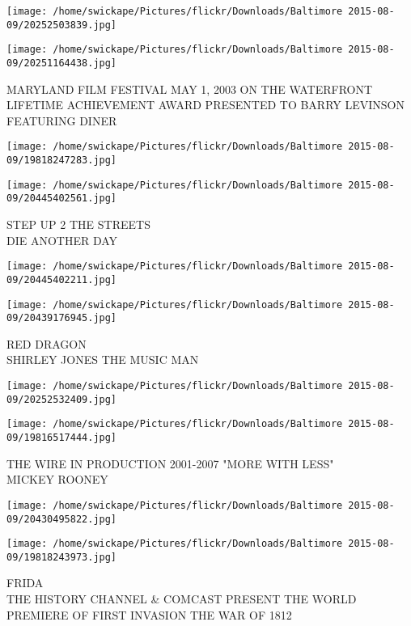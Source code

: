 \documentclass[10pt,letterpaper]{article}
\begin{document}
\texttt{[image: /home/swickape/Pictures/flickr/Downloads/Baltimore 2015-08-09/20252503839.jpg]}

\vspace{0.25in}
\texttt{[image: /home/swickape/Pictures/flickr/Downloads/Baltimore 2015-08-09/20251164438.jpg]}

MARYLAND FILM FESTIVAL MAY 1, 2003 ON THE WATERFRONT\\
LIFETIME ACHIEVEMENT AWARD PRESENTED TO BARRY LEVINSON FEATURING DINER
\pagebreak

\texttt{[image: /home/swickape/Pictures/flickr/Downloads/Baltimore 2015-08-09/19818247283.jpg]}

\vspace{0.25in}
\texttt{[image: /home/swickape/Pictures/flickr/Downloads/Baltimore 2015-08-09/20445402561.jpg]}

STEP UP 2 THE STREETS\\
DIE ANOTHER DAY
\pagebreak

\texttt{[image: /home/swickape/Pictures/flickr/Downloads/Baltimore 2015-08-09/20445402211.jpg]}

\vspace{0.25in}
\texttt{[image: /home/swickape/Pictures/flickr/Downloads/Baltimore 2015-08-09/20439176945.jpg]}

RED DRAGON\\
SHIRLEY JONES THE MUSIC MAN
\pagebreak

\texttt{[image: /home/swickape/Pictures/flickr/Downloads/Baltimore 2015-08-09/20252532409.jpg]}

\vspace{0.25in}
\texttt{[image: /home/swickape/Pictures/flickr/Downloads/Baltimore 2015-08-09/19816517444.jpg]}

THE WIRE IN PRODUCTION 2001{-}2007 "MORE WITH LESS"\\
MICKEY ROONEY
\pagebreak

\texttt{[image: /home/swickape/Pictures/flickr/Downloads/Baltimore 2015-08-09/20430495822.jpg]}

\vspace{0.25in}
\texttt{[image: /home/swickape/Pictures/flickr/Downloads/Baltimore 2015-08-09/19818243973.jpg]}

FRIDA\\
THE HISTORY CHANNEL \& COMCAST PRESENT THE WORLD PREMIERE OF FIRST INVASION THE WAR OF 1812
\pagebreak
\end{document}
